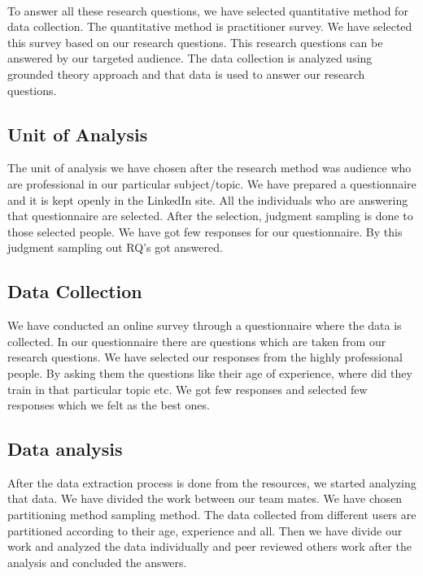 \paragraph{}     
To answer all these research questions, we have selected quantitative method for data collection. The quantitative method is practitioner survey. We have selected this survey based on our research questions. This research questions can be answered by our targeted audience. The data collection is analyzed using grounded theory approach and that data is used to answer our research questions.

\subsection{Unit of Analysis}
The unit of analysis we have chosen after the research method was audience who are professional in our particular subject/topic. We have prepared a questionnaire and it is kept openly in the LinkedIn site. All the individuals who are answering that questionnaire are selected. After the selection, judgment sampling is done to those selected people. We have got few responses for our questionnaire. By this judgment sampling out RQ’s got answered.

\subsection{Data Collection}
We have conducted an online survey through a questionnaire where the data is collected. In our questionnaire there are questions which are taken from our research questions.
We have selected our responses from the highly professional people. By asking them the questions like their age of experience, where did they train in that particular topic etc. We got few responses and selected few responses which we felt as the best ones.

\subsection{Data analysis}
After the data extraction process is done from the resources, we started analyzing that data. We have divided the work between our team mates. We have chosen partitioning method sampling method. The data collected from different users are partitioned according to their age, experience and all. Then we have divide our work and analyzed the data individually and peer reviewed others work after the analysis and concluded the answers.


